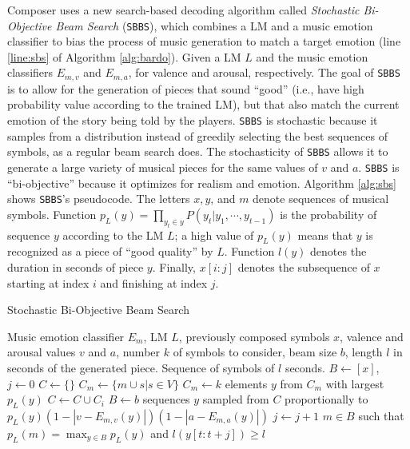 Composer uses a new search-based decoding algorithm called \textit{Stochastic Bi-Objective Beam Search} (\texttt{SBBS}), which combines a LM and a music emotion classifier to bias the process of music generation to match a target emotion (line \ref{line:sbs} of Algorithm \ref{alg:bardo}). Given a LM $L$ and the music emotion classifiers $E_{m, v}$ and $E_{m, a}$, for valence and arousal, respectively. The goal of \texttt{SBBS} is to allow for the generation of pieces that sound ``good'' (i.e., have high probability value according to the trained LM), but that also match the current emotion of the story being told by the players. \texttt{SBBS} is stochastic because it samples from a distribution instead of greedily selecting the best sequences of symbols, as a regular beam search does. The stochasticity of \texttt{SBBS} allows it to generate a large variety of musical pieces for the same values of $v$ and $a$. \texttt{SBBS} is ``bi-objective'' because it optimizes for realism and emotion.
Algorithm \ref{alg:sbs} shows \texttt{SBBS}'s pseudocode. The letters $x, y$, and $m$ denote sequences of musical symbols. Function $p_L(y) = \prod_{y_t \in y} P(y_t|y_1, \cdots, y_{t-1})$ is the probability of sequence $y$ according to the LM $L$; a high value of $p_L(y)$ means that $y$ is recognized as a piece of ``good quality'' by $L$. Function $l(y)$ denotes the duration in seconds of piece $y$. Finally, $x[i:j]$ denotes the subsequence of $x$ starting at index $i$ and finishing at index $j$.

\begin{algorithm}[!h]
\caption{Stochastic Bi-Objective Beam Search}
\label{alg:sbs}
\begin{algorithmic}[1]
\REQUIRE Music emotion classifier $E_m$, LM $L$, previously composed symbols $x$, valence and arousal values $v$ and $a$, number $k$ of symbols to consider, beam size $b$, length $l$ in seconds of the generated piece.
\ENSURE Sequence of symbols of $l$ seconds.
\STATE $B \gets [x]$, $j \gets 0$ \label{line:sbs:init}
 \label{line:sbs:stopping_condition}
    \STATE $C \gets \{\}$ \label{line:sbs:init_while}
        \STATE $C_m \gets \{m \cup s \vert s \in V\}$ \label{line:sbs:children}
        \STATE $C_m \gets k$ elements $y$ from $C_m$ with largest $p_L(y)$ \label{line:sbs:pruning_model}
        \STATE $C \gets C \cup C_i$ \label{line:sbs:total_children}
    \ENDFOR
    \STATE $B \gets b$ sequences $y$ sampled from $C$ proportionally to $p_L(y) (1 - |v - E_{m,v}(y)|) (1 - |a - E_{m,a}(y)|)$ \label{line:sbs:sample_next_beam}
    \STATE $j \gets j + 1$ \label{line:sbs:end_while}
\ENDWHILE
\RETURN $m \in B$ such that $p_L(m) = \max_{y \in B}p_L(y)$ and $l(y[t: t+j]) \geq l$ \label{line:sbs:return}
\end{algorithmic}
\end{algorithm}

